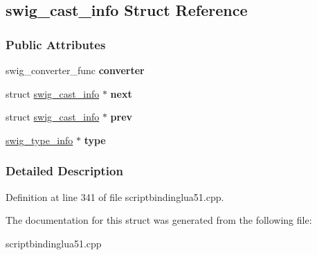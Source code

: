 \hypertarget{structswig__cast__info}{
\subsection{swig\_\-cast\_\-info Struct Reference}
\label{structswig__cast__info}
}
\subsubsection*{Public Attributes}
\begin{DoxyCompactItemize}
\item 
\hypertarget{structswig__cast__info_aa630fddfbb1bf9c97a03f9479ba32f76}{
swig\_\-converter\_\-func {\bfseries converter}}
\label{structswig__cast__info_aa630fddfbb1bf9c97a03f9479ba32f76}

\item 
\hypertarget{structswig__cast__info_ae79c6fa058a9d908bbdac14db0c9db5e}{
struct \hyperlink{structswig__cast__info}{swig\_\-cast\_\-info} $\ast$ {\bfseries next}}
\label{structswig__cast__info_ae79c6fa058a9d908bbdac14db0c9db5e}

\item 
\hypertarget{structswig__cast__info_afc685bcf38a5a06c6601775138c5999c}{
struct \hyperlink{structswig__cast__info}{swig\_\-cast\_\-info} $\ast$ {\bfseries prev}}
\label{structswig__cast__info_afc685bcf38a5a06c6601775138c5999c}

\item 
\hypertarget{structswig__cast__info_a1c9023a301c8d6806209f4e10df6e9e0}{
\hyperlink{structswig__type__info}{swig\_\-type\_\-info} $\ast$ {\bfseries type}}
\label{structswig__cast__info_a1c9023a301c8d6806209f4e10df6e9e0}

\end{DoxyCompactItemize}


\subsubsection{Detailed Description}


Definition at line 341 of file scriptbindinglua51.cpp.



The documentation for this struct was generated from the following file:\begin{DoxyCompactItemize}
\item 
scriptbindinglua51.cpp\end{DoxyCompactItemize}
